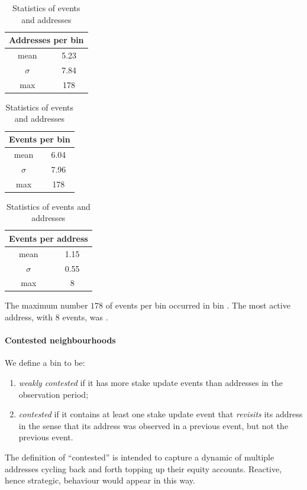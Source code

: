 \begin{table} 
  \hfill
  \begin{tabular}{cc}
    \multicolumn{2}{l}{Addresses per bin} \\
    \toprule 
    mean      & 5.23 \\
    $\sigma$  & 7.84 \\
    max       & 178 \\
    \bottomrule
  \end{tabular}
  \hfill
  \begin{tabular}{cc}
    \multicolumn{2}{l}{Events per bin} \\
    \toprule 
    mean      & 6.04 \\
    $\sigma$  & 7.96 \\
    max       & 178 \\
    \bottomrule
  \end{tabular}
  \hfill
  \begin{tabular}{cc}
    \multicolumn{2}{l}{Events per address}\\
    \toprule
    mean      & 1.15 \\
    $\sigma$  & 0.55 \\
    max       & 8  \\
    \bottomrule
  \end{tabular}
  \hfill
  \caption{
    Statistics of events and addresses
  }
  \label{event-statistics}
\end{table}

The maximum number $178$ of events per bin occurred in bin .
%
The most active address, with $8$ events, was .

\paragraph{Contested neighbourhoods}
We define a bin to be:
\begin{enumerate}
  \item \emph{weakly contested} if it has more stake update events than addresses in the observation period;
  \item \emph{contested} if it contains at least one stake update event that \emph{revisits} its address in the sense that its address was observed in a previous event, but not the previous event.
\end{enumerate}
The definition of ``contested'' is intended to capture a dynamic of multiple addresses cycling back and forth topping up their equity accounts.
%
Reactive, hence strategic, behaviour would appear in this way.

